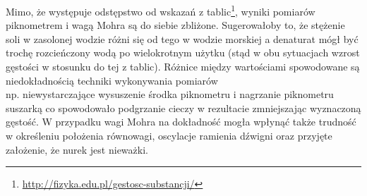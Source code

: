 \documentclass{article}
\begin{document}
Mimo, że występuje odstępstwo od wskazań z tablic\footnote{\url{http://fizyka.edu.pl/gestosc-substancji/}}, wyniki pomiarów piknometrem i wagą Mohra są do siebie zbliżone.  Sugerowałoby to,  że stężenie soli w zasolonej wodzie różni się od tego w wodzie morskiej a denaturat mógł być trochę rozcieńczony wodą po wielokrotnym użytku (stąd w obu sytuacjach wzrost gęstości w stosunku do tej z tablic).  Różnice między wartościami spowodowane są niedokładnością techniki wykonywania pomiarów \\ np.  niewystarczające wysuszenie środka piknometru i nagrzanie piknometru suszarką co spowodowało podgrzanie cieczy w rezultacie zmniejszając wyznaczoną gęstość.  W przypadku wagi Mohra na dokładność mogła wpłynąć także trudność w określeniu położenia równowagi, oscylacje ramienia dźwigni oraz przyjęte założenie, że nurek jest nieważki.
\end{document}
